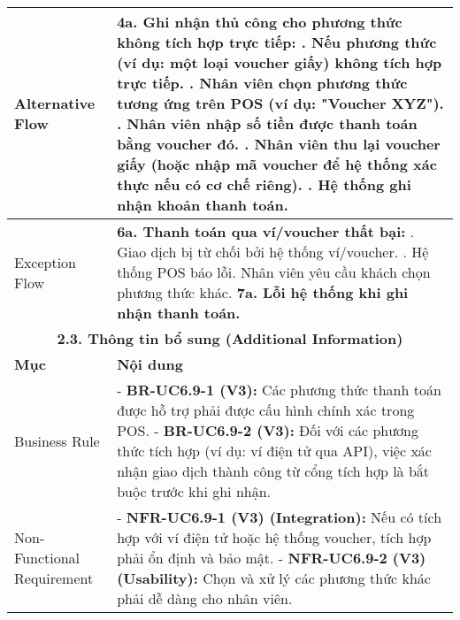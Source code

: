 \begin{longtable}{|m{4cm}|p{11cm}|}
\hline
Alternative Flow & \textbf{4a. Ghi nhận thủ công cho phương thức không tích hợp trực tiếp:} \newline    1. Nếu phương thức (ví dụ: một loại voucher giấy) không tích hợp trực tiếp. \newline    2. Nhân viên chọn phương thức tương ứng trên POS (ví dụ: "Voucher XYZ"). \newline    3. Nhân viên nhập số tiền được thanh toán bằng voucher đó. \newline    4. Nhân viên thu lại voucher giấy (hoặc nhập mã voucher để hệ thống xác thực nếu có cơ chế riêng). \newline    5. Hệ thống ghi nhận khoản thanh toán. \\
\hline
Exception Flow & \textbf{6a. Thanh toán qua ví/voucher thất bại:} \newline    1. Giao dịch bị từ chối bởi hệ thống ví/voucher. \newline    2. Hệ thống POS báo lỗi. Nhân viên yêu cầu khách chọn phương thức khác. \newline \textbf{7a. Lỗi hệ thống khi ghi nhận thanh toán.} \\
\hline
\multicolumn{2}{|c|}{\textbf{2.3. Thông tin bổ sung (Additional Information)}} \\
\hline
\textbf{Mục} & \textbf{Nội dung} \\
\hline
Business Rule & - \textbf{BR-UC6.9-1 (V3):} Các phương thức thanh toán được hỗ trợ phải được cấu hình chính xác trong POS. \newline - \textbf{BR-UC6.9-2 (V3):} Đối với các phương thức tích hợp (ví dụ: ví điện tử qua API), việc xác nhận giao dịch thành công từ cổng tích hợp là bắt buộc trước khi ghi nhận. \\
\hline
Non-Functional Requirement & - \textbf{NFR-UC6.9-1 (V3) (Integration):} Nếu có tích hợp với ví điện tử hoặc hệ thống voucher, tích hợp phải ổn định và bảo mật. \newline - \textbf{NFR-UC6.9-2 (V3) (Usability):} Chọn và xử lý các phương thức khác phải dễ dàng cho nhân viên. \\
\hline
\end{longtable}

